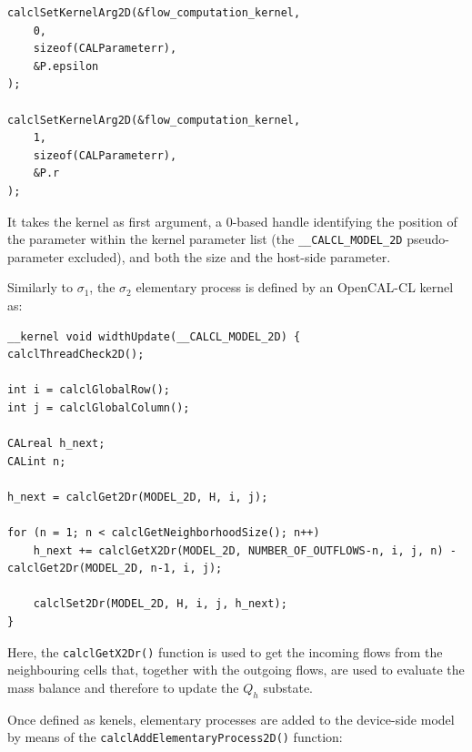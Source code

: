 \begin{lstlisting}
calclSetKernelArg2D(&flow_computation_kernel,
	0,
	sizeof(CALParameterr),
	&P.epsilon
);

calclSetKernelArg2D(&flow_computation_kernel,
	1,
	sizeof(CALParameterr),
	&P.r
);
\end{lstlisting}

\noindent It takes the kernel as first argument, a 0-based handle
identifying the position of the parameter within the kernel
parameter list (the \verb'__CALCL_MODEL_2D' pseudo-parameter
excluded), and both the size and the host-side parameter.

Similarly to $\sigma_1$, the $\sigma_2$ elementary process is
defined by an OpenCAL-CL kernel as:

\begin{lstlisting}
__kernel void widthUpdate(__CALCL_MODEL_2D) {
calclThreadCheck2D();

int i = calclGlobalRow();
int j = calclGlobalColumn();

CALreal h_next;
CALint n;

h_next = calclGet2Dr(MODEL_2D, H, i, j);

for (n = 1; n < calclGetNeighborhoodSize(); n++)
	h_next += calclGetX2Dr(MODEL_2D, NUMBER_OF_OUTFLOWS-n, i, j, n) - calclGet2Dr(MODEL_2D, n-1, i, j);

	calclSet2Dr(MODEL_2D, H, i, j, h_next);
}
\end{lstlisting}

\noindent Here, the \verb'calclGetX2Dr()' function is used to get
the incoming flows from the neighbouring cells that, together with
the outgoing flows, are used to evaluate the mass balance and
therefore to update the $Q_h$ substate.

Once defined as kenels, elementary processes are added to the
device-side model by means of the
\verb'calclAddElementaryProcess2D()' function:

